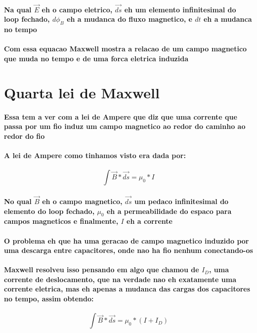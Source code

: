 \documentclass[12pt,twoside, a4paper, twocolumn]{article}
\begin{document}
\paragraph*{Na qual $\vec{E}$ eh o campo eletrico, $\vec{ds}$ eh um elemento infinitesimal do loop fechado, $d\phi_B$ eh a mudanca do fluxo magnetico, e $dt$ eh a mudanca no tempo}
\paragraph*{Com essa equacao Maxwell mostra a relacao de um campo magnetico que muda no tempo e de uma forca eletrica induzida}

\section{Quarta lei de Maxwell}
\paragraph*{Essa tem a ver com a lei de Ampere que diz que uma corrente que passa por um fio induz um campo magnetico ao redor do caminho ao redor do fio }
\paragraph*{A lei de Ampere como tinhamos visto era dada por:}
\begin{equation}
    \int \vec{B} * \vec{ds} = \mu_0 * I
\end{equation}
\paragraph*{No qual $\vec{B}$ eh o campo magnetico, $\vec{ds}$ um pedaco infinitesimal do elemento do loop fechado, $\mu_0$ eh a permeabilidade do espaco para campos magneticos e finalmente, $I$ eh a corrente}
\paragraph*{O problema eh que ha uma geracao de campo magnetico induzido por uma descarga entre capacitores, onde nao ha fio nenhum conectando-os}
\paragraph*{Maxwell resolveu isso pensando em algo que chamou de $I_D$, uma corrente de deslocamento, que na verdade nao eh exatamente uma corrente eletrica, mas eh apenas a mudanca das cargas dos capacitores no tempo, assim obtendo:}
\begin{equation}
    \int \vec{B} * \vec{ds} = \mu_0 * \left(I +I_D\right)
\end{equation}
\end{document}
